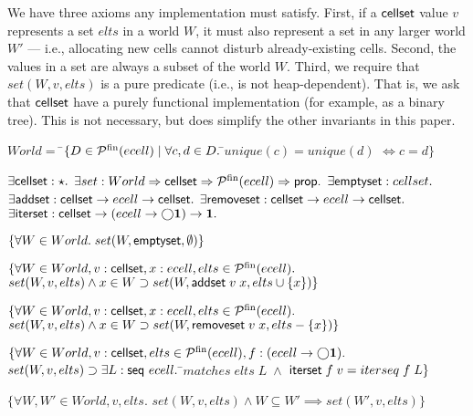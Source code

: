 \documentclass[preprint,natbib]{sigplanconf}
\begin{document}
We have three axioms any implementation must satisfy. First, if a
$\mbox{\textsf{{cellset}}}$ value $v$ represents a set $elts$ in a world $W$, it must
also represent a set in any larger world $W'$ --- i.e., allocating
new cells cannot disturb already-existing cells.  Second, the values
in a set are always a subset of the world $W$.  Third, we require
that $set(W,v,elts)$ is a pure predicate (i.e., is not
heap-dependent). That is, we ask that $\mbox{\textsf{{cellset}}}$ have a purely
functional implementation (for example, as a binary tree). This is not
necessary, but does simplify the other invariants in this paper.

{\small
\begin{specification}
\nextline
$World = $ \nextline
\;\;\;\;\=$\{D \in \mathcal{P}^{\mathrm{fin}}({ecell})\;|\;\forall c,d \in D.\;$\=$unique(c) = unique(d)$\nextline
        \>                                                      \>$\iff c = d\}$\nextline[0.5em]

$\exists \mbox{\textsf{{cellset}}} : \star.$ \nextline
$\exists set : World \Rightarrow \mbox{\textsf{{cellset}}} \Rightarrow \mathcal{P}^{\mathrm{fin}}({ecell}) \Rightarrow \mbox{\textsf{{prop}}}.$ \nextline
$\exists \mbox{\textsf{{emptyset}}}    : cellset.$ \nextline
$\exists \mbox{\textsf{{addset}}}      : \mbox{\textsf{{cellset}}} \to ecell \to \mbox{\textsf{{cellset}}}.$ \nextline
$\exists \mbox{\textsf{{removeset}}}   : \mbox{\textsf{{cellset}}} \to ecell \to \mbox{\textsf{{cellset}}}.$ \nextline
$\exists \mbox{\textsf{{iterset}}}     : \mbox{\textsf{{cellset}}} \to (ecell \to \bigcirc{\mathbf{1}}) \to \mathbf{1}.$\nextline[0.5em]

$\{{\forall W \in World.\; set(W, \mbox{\textsf{{emptyset}}}, \emptyset)}\}$ 

\specand \nextline[0.5em]

$\{\forall W \in World, v : \mbox{\textsf{{cellset}}}, x : ecell, elts \in \mathcal{P}^{\mathrm{fin}}({ecell}).$ \nextline 
\> $set(W, v, elts) \land x \in W \supset set(W, \mbox{\textsf{{addset}}}\;v\;x, elts \cup \{{x}\})\}$ \specand \nextline[0.5em]


$\{\forall W \in World, v : \mbox{\textsf{{cellset}}}, x : ecell, elts \in \mathcal{P}^{\mathrm{fin}}({ecell}).$ \nextline 
\> $set(W, v, elts) \land x \in W \supset set(W, \mbox{\textsf{{removeset}}}\;v\;x, elts - \{{x}\})\}$ \specand \nextline[0.5em]


$\{\forall W \in World, v : \mbox{\textsf{{cellset}}}, elts \in \mathcal{P}^{\mathrm{fin}}({ecell}), 
         f : (ecell \to \bigcirc{\mathbf{1}}).$ \nextline 
\> $set(W, v, elts) \supset \exists L : \mbox{\textsf{{seq }}}{ecell}.\;$\=$matches\;elts\;L\; \land$ \nextline
\>                                \>$\mbox{\textsf{{iterset}}}\;f\;v = iterseq\;f\;L\}$ \specand \nextline[0.5em]


$\{\forall W, W' \in World, v, elts.$ \nextline
\>$set(W,v,elts) \land W \subseteq W' \implies set(W',v, elts)\}$\specand \nextline[0.5em]


\end{specification}}
\end{document}
